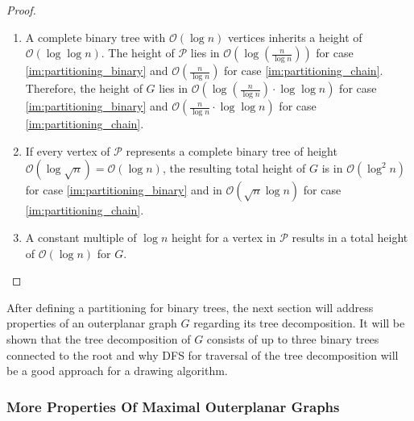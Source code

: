 \begin{proof}
\begin{enumerate}
		\item A complete binary tree with $\mathcal{O}(\log n)$ vertices inherits a height of $\mathcal{O}(\log \log n)$. The height of $\mathcal{P}$ lies in $\mathcal{O}\left(\log\left(\frac{n}{\log n}\right)\right)$ for case \ref{im:partitioning_binary} and $\mathcal{O}\left(\frac{n}{\log n}\right)$ for case \ref{im:partitioning_chain}. Therefore, the height of $G$ lies in $\mathcal{O}\left(\log\left(\frac{n}{\log n}\right)\cdot \log \log n \right)$ for case \ref{im:partitioning_binary} and $\mathcal{O}\left(\frac{n}{\log n}\cdot \log \log n\right)$ for case \ref{im:partitioning_chain}.
		\item If every vertex of $\mathcal{P}$ represents a complete binary tree of height $\mathcal{O}(\log \sqrt{n}) = \mathcal{O}(\log n)$, the resulting total height of $G$ is in $\mathcal{O}(\log^2 n)$ for case \ref{im:partitioning_binary} and in $\mathcal{O}(\sqrt{n} \log n)$ for case \ref{im:partitioning_chain}. 
		\item A constant multiple of $\log n$ height for a vertex in $\mathcal{P}$ results in a total height of $\mathcal{O}(\log n)$ for $G$.
	\end{enumerate}
\end{proof}

After defining a partitioning for binary trees, the next section will address properties of an outerplanar graph $G$ regarding its tree decomposition. It will be shown that the tree decomposition of $G$ consists of up to three binary trees connected to the root and why DFS for traversal of the tree decomposition will be a good approach for a drawing algorithm.

\subsubsection{More Properties Of Maximal Outerplanar Graphs}

